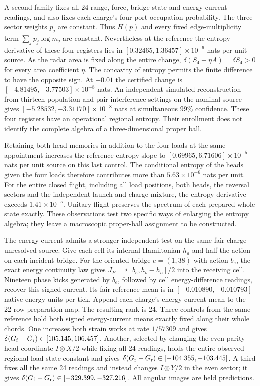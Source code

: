 A second family fixes all 24 range, force, bridge-state and energy-current
readings, and also fixes each charge's four-port occupation probability.
The three sector weights $p_j$ are constant. Thus $H(p)$ and every
fixed edge-multiplicity term $\sum_j p_j\log m_j$ are constant.
Nevertheless at the reference the entropy derivative of these four
registers lies in $[0.32465,1.36457]\times10^{-6}$ nats per unit
source. As the radar area is fixed along the entire change,
$\delta(S_4+\eta A)=\delta S_4>0$ for every area coefficient $\eta$.
The concavity of entropy permits the finite difference to have the
opposite sign. At $+0.01$ the certified change is
$[-4.81495,-3.77503]\times10^{-8}$ nats. An independent simulated
reconstruction from thirteen population and pair-interference settings on
the nominal source gives $[-5.28532,-3.31170]\times10^{-8}$ nats at
simultaneous 99\% confidence. These four registers have an operational
regional entropy. Their enrollment does not identify the complete algebra
of a three-dimensional proper ball.

Retaining both head memories in addition to the four loads at the same
appointment increases the reference entropy slope to
$[0.69965,6.71606]\times10^{-5}$ nats per unit source on this last
control. The conditional entropy of the heads given the four loads
therefore contributes more than $5.63\times10^{-6}$ nats per unit.
For the entire closed flight, including all load positions, both heads,
the reversal sectors and the independent launch and charge mixture,
the entropy derivative exceeds $1.41\times10^{-5}$. Unitary flight
preserves the spectrum of each prepared whole state exactly. These
observations test two specific ways of enlarging the entropy algebra;
they leave a macroscopic proper-ball assignment to be constructed.

The energy current admits a stronger independent test on the same
fair charge-unresolved source. Give each cell its internal Hamiltonian
$h_a$ and half the action on each incident bridge. For the oriented
bridge $e=(1,38)$ with action $b_e$, the exact energy continuity law
gives $J_E=i[b_e,h_b-h_a]/2$ into the receiving cell. Nineteen phase
kicks generated by $b_e$, followed by cell energy-difference readings,
recover this signed current. Its fair reference mean is in
$[-0.010890,-0.010793]$ native energy units per tick.
Append each charge's energy-current mean to the 22-row preparation map.
The resulting rank is 24. Three controls from the same reference hold
both signed energy-current means exactly fixed along their whole
chords. One increases both strain works at rate $1/57309$ and gives
$\delta(G_{\rm f}-G_{\rm r})\in[105.145,106.457]$. Another, selected
by changing the even-parity head coordinate $I\otimes X/2$ while
fixing all 24 readings, holds the entire observed regional load state
constant and gives $\delta(G_{\rm f}-G_{\rm r})\in[-104.355,-103.445]$.
A third fixes all the same 24 readings and instead changes
$I\otimes Y/2$ in the even sector; it gives
$\delta(G_{\rm f}-G_{\rm r})\in[-329.399,-327.216]$.
All angular images are held predictions.

